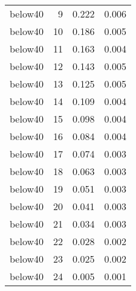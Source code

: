 \begin{table}[!h]
\begin{tabular}[t]{lrrr}
below40 & 9 & 0.222 & 0.006\\
below40 & 10 & 0.186 & 0.005\\
below40 & 11 & 0.163 & 0.004\\
\addlinespace
below40 & 12 & 0.143 & 0.005\\
below40 & 13 & 0.125 & 0.005\\
below40 & 14 & 0.109 & 0.004\\
below40 & 15 & 0.098 & 0.004\\
below40 & 16 & 0.084 & 0.004\\
\addlinespace
below40 & 17 & 0.074 & 0.003\\
below40 & 18 & 0.063 & 0.003\\
below40 & 19 & 0.051 & 0.003\\
below40 & 20 & 0.041 & 0.003\\
below40 & 21 & 0.034 & 0.003\\
\addlinespace
below40 & 22 & 0.028 & 0.002\\
below40 & 23 & 0.025 & 0.002\\
below40 & 24 & 0.005 & 0.001\\
\bottomrule
\end{tabular}
\end{table}
